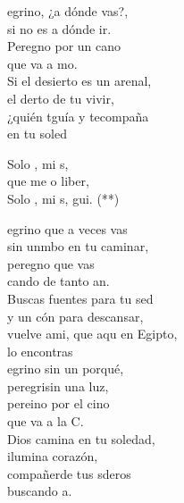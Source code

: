\begin{cancion}%
	egrino, ¿a dónde vas?, \\
	si no es a dónde ir.\\
	Peregno por un cano \\
	que va a mo. \\
Si el desierto es un arenal, \\
	el derto de tu vivir,\\
	¿quién tguía y tecompaña \\
	en tu soled  \\
	\begin{chorus}%
	Solo , mi s,\\
	que me o liber,\\
	Solo , mi s, gui. (**) \\
	\end{chorus}%
	egrino que a veces vas \\
	sin unmbo en tu caminar,\\
	peregno que vas \\
	cando de tanto an. \\
Buscas fuentes para tu sed \\
	y un cón para descansar,\\
	vuelve ami, que aqu en Egipto, \\
	lo encontras \\
	egrino sin un porqué,\\
	peregrisin una luz,\\
	pereino por el cino \\
	que va a la C. \\
Dios camina en tu soledad,\\
	ilumina corazón,\\
	compañerde tus sderos \\
	buscando a. \\
\end{cancion}%
